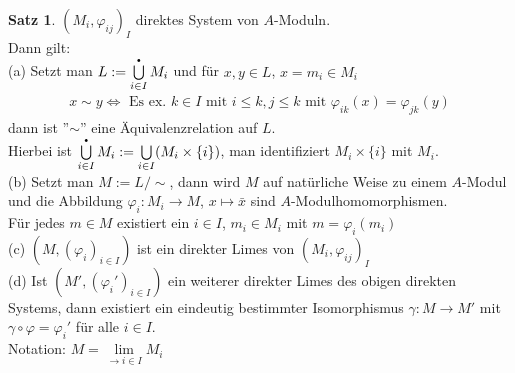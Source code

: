 \documentclass[10pt,a4paper,numbers=endperiod]{scrreprt}
\theoremstyle{definition}
\newtheorem{satz}{Satz}[section]
\newcommand{\point}{\text{\textbullet}}
\begin{document}
\begin{satz}
	$(M_i, \varphi_{ij})_I$ direktes System von $A$-Moduln.\\
	Dann gilt:\\
	(a) Setzt man $L := \bigcup\limits_{i \in I}^\point M_i$ und für $x,y \in L$, $x = m_i \in M_i$ \begin{align*}
	x \sim y \Leftrightarrow \text{ Es ex. } k \in I \text{ mit } i \leq k, j \leq k \text{ mit } \varphi_{ik}(x) = \varphi_{jk}(y)
	\end{align*}
	dann ist ''$\sim$'' eine Äquivalenzrelation auf $L$.\\
	Hierbei ist $\bigcup\limits_{i \in I}^\point M_i := \bigcup\limits_{i \in I} (M_i \times \{i\})$, man identifiziert $M_i \times \{i\}$ mit $M_i$.\\
	(b) Setzt man $M:= L/\sim$, dann wird $M$ auf natürliche Weise zu einem $A$-Modul und die Abbildung $\varphi_i: M_i \to M$, $x \mapsto \bar{x}$ sind $A$-Modulhomomorphismen.\\
	Für jedes $m \in M$ existiert ein $i \in I$, $m_i \in M_i$ mit $m = \varphi_i(m_i)$\\
	(c) $(M, (\varphi_i)_{i \in I})$ ist ein direkter Limes von $(M_i, \varphi_{ij})_I$\\
	(d) Ist $(M', (\varphi_i')_{i \in I})$ ein weiterer direkter Limes des obigen direkten Systems, dann existiert ein eindeutig bestimmter Isomorphismus $\gamma: M \to M'$ mit $\gamma \circ \varphi = \varphi_i'$ für alle $i \in I$.\\
	Notation: $M = \lim\limits_{\to i \in I} M_i$
\end{satz}
\end{document}
